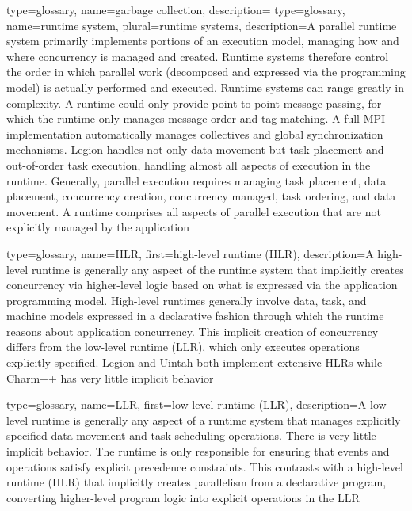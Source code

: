 {
  type=glossary,
  name={garbage collection},
  description={}
}
{
  type=glossary,
  name={runtime system},
  plural={runtime systems},
  description={A parallel runtime system primarily implements portions of an
  \gls{execution model}, managing how and where concurrency is managed and created. 
 Runtime systems therefore control the order in which parallel work (decomposed
     and expressed via the \gls{programming model}) is actually performed and executed.  Runtime systems can range greatly in complexity. A runtime could only provide point-to-point message-passing, for which the runtime only manages message order and tag matching. A full \gls{MPI} implementation automatically manages collectives and global synchronization mechanisms.
  Legion handles not only data movement but task placement and out-of-order task execution, handling almost all aspects of execution in the runtime.  Generally, parallel execution requires managing task placement, data placement, concurrency creation, concurrency managed, task ordering, and data movement. A runtime comprises all aspects of parallel execution that are not explicitly managed by the application}
}

{
  type=glossary,
  name={HLR},
  first={high-level runtime (HLR)},
  description={A high-level runtime is generally any aspect of the runtime system that implicitly creates concurrency via higher-level logic based on what is expressed via the application programming model.  High-level runtimes generally involve data, task, and machine models expressed in a \gls{declarative} fashion through which the runtime reasons about application concurrency. This implicit creation of concurrency differs from the low-level runtime (\gls{LLR}), which only executes operations explicitly specified.  Legion and Uintah both implement extensive HLRs while Charm++ has very little implicit behavior}
}

{
  type=glossary,
  name={LLR},
  first={low-level runtime (LLR)},
  description={A low-level runtime is generally any aspect of a \gls{runtime system} that manages explicitly specified data movement and task scheduling operations. There is very little implicit behavior. The runtime is only responsible for ensuring that events and operations satisfy explicit precedence constraints. This contrasts with a high-level runtime (\gls{HLR}) that implicitly creates parallelism from a declarative program, converting higher-level program logic into explicit operations in the LLR}
}

